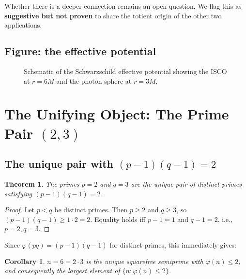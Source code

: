 \documentclass[preprint]{revtex4-2}
\newtheorem{theorem}{Theorem}
\newtheorem{corollary}{Corollary}
\begin{document}
Whether there is a deeper connection remains an open question. We flag this as \textbf{suggestive but not proven} to share the totient origin of the other two applications.

\subsection{Figure: the effective potential}

\begin{figure}[h]
\centering
\caption{Schematic of the Schwarzschild effective potential showing the ISCO at $r = 6M$ and the photon sphere at $r = 3M$.}
\label{fig:potential}
\end{figure}

\section{The Unifying Object: The Prime Pair $(2, 3)$}\label{sec:prime-pair}

\subsection{The unique pair with $(p-1)(q-1) = 2$}

\begin{theorem}\label{thm:unique-pair}
The primes $p = 2$ and $q = 3$ are the unique pair of distinct primes satisfying $(p-1)(q-1) = 2$.
\end{theorem}

\begin{proof}
Let $p < q$ be distinct primes. Then $p \geq 2$ and $q \geq 3$, so $(p-1)(q-1) \geq 1 \cdot 2 = 2$. Equality holds iff $p-1 = 1$ and $q-1 = 2$, i.e., $p = 2, q = 3$.
\end{proof}

Since $\varphi(pq) = (p-1)(q-1)$ for distinct primes, this immediately gives:

\begin{corollary}
$n = 6 = 2 \cdot 3$ is the unique squarefree semiprime with $\varphi(n) \leq 2$, and consequently the largest element of $\{n : \varphi(n) \leq 2\}$.
\end{corollary}
\end{document}
